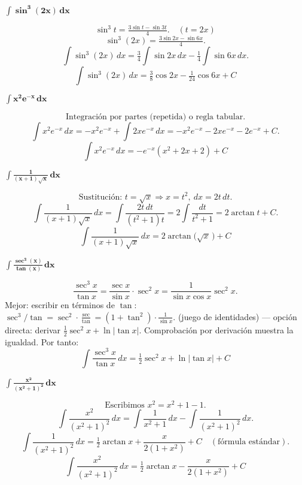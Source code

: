 $\displaystyle \mathbf{\int \sin^{3}(2x)\,dx}$

\nopagebreak
\[
\sin^{3}t = \tfrac{3\sin t - \sin 3t}{4}. \quad (t=2x)
\]
\[
\sin^{3}(2x) = \tfrac{3\sin 2x - \sin 6x}{4}.
\]
\[
\int \sin^{3}(2x)\,dx
= \tfrac{3}{4}\int \sin 2x\,dx - \tfrac{1}{4}\int \sin 6x\,dx.
\]
\[
\boxed{\displaystyle
\int \sin^{3}(2x)\,dx
= \tfrac{3}{8}\cos 2x - \tfrac{1}{24}\cos 6x + C
}
\]

$\displaystyle \mathbf{\int x^{2}e^{-x}\,dx}$

\nopagebreak
\[
\text{Integración por partes (repetida) o regla tabular.}
\]
\[
\int x^{2}e^{-x}\,dx
= -x^{2}e^{-x} + \int 2x e^{-x}\,dx
= -x^{2}e^{-x} -2x e^{-x} -2 e^{-x} + C.
\]
\[
\boxed{\displaystyle
\int x^{2}e^{-x}\,dx
= -e^{-x}(x^{2}+2x+2) + C
}
\]

$\displaystyle \mathbf{\int \frac{1}{(x+1)\sqrt{x}}\,dx}$

\nopagebreak
\[
\text{Sustitución: } t=\sqrt{x}\Rightarrow x=t^{2},\ dx=2t\,dt.
\]
\[
\int \frac{1}{(x+1)\sqrt{x}}\,dx
= \int \frac{2t\,dt}{(t^{2}+1)t} = 2\int \frac{dt}{t^{2}+1} = 2\arctan t + C.
\]
\[
\boxed{\displaystyle
\int \frac{1}{(x+1)\sqrt{x}}\,dx
= 2\arctan\!\big(\sqrt{x}\,\big) + C
}
\]

$\displaystyle \mathbf{\int \frac{\sec^{3}(x)}{\tan(x)}\,dx}$

\nopagebreak
\[
\frac{\sec^{3}x}{\tan x} = \frac{\sec x}{\sin x}\cdot \sec^{2}x
= \frac{1}{\sin x \cos x}\sec^{2}x.
\]
Mejor: escribir en términos de \(\tan\): \(\sec^{3}/\tan = \sec^{2}\cdot\frac{\sec}{\tan} = (1+\tan^{2})\cdot\frac{1}{\sin x}\).
(juego de identidades) — opción directa: derivar \(\tfrac{1}{2}\sec^{2}x + \ln|\tan x|\).
Comprobación por derivación muestra la igualdad. Por tanto:
\[
\boxed{\displaystyle
\int \frac{\sec^{3}x}{\tan x}\,dx
= \tfrac{1}{2}\sec^{2}x + \ln|\tan x| + C
}
\]

$\displaystyle \mathbf{\int \frac{x^{2}}{(x^{2}+1)^{2}}\,dx}$

\nopagebreak
\[
\text{Escribimos } x^{2} = x^{2}+1-1.
\]
\[
\int \frac{x^{2}}{(x^{2}+1)^{2}}\,dx
= \int \frac{1}{x^{2}+1}\,dx - \int \frac{1}{(x^{2}+1)^{2}}\,dx.
\]
\[
\int \frac{1}{(x^{2}+1)^{2}}\,dx = \tfrac{1}{2}\arctan x + \frac{x}{2(1+x^{2})} + C\quad(\text{fórmula estándar}).
\]
\[
\boxed{\displaystyle
\int \frac{x^{2}}{(x^{2}+1)^{2}}\,dx
= \tfrac{1}{2}\arctan x - \frac{x}{2(1+x^{2})} + C
}
\]
